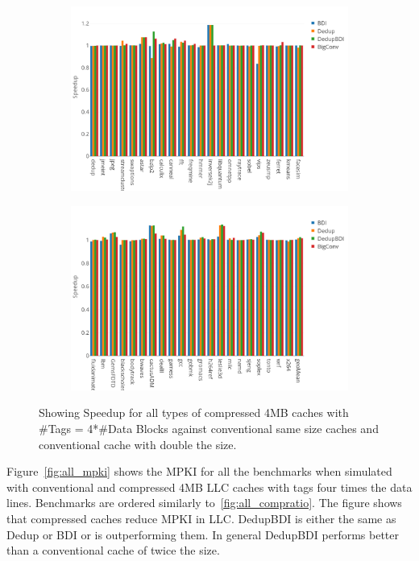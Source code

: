 \begin{figure}
    \begin{subfigure}{\textwidth}
        \includegraphics[width=\textwidth]{all4-speedup1.png}
    \end{subfigure}
    \begin{subfigure}{\textwidth}
        \includegraphics[width=\textwidth]{all4-speedup2.png}
    \end{subfigure}
    \caption[All benchmarks: 0.5MB Speedup]{Showing Speedup for all types of compressed 4MB caches with \#Tags = 4*\#Data Blocks against conventional same size caches and conventional cache with double the size.}
    \label{fig:all_speedup2}
\end{figure}
Figure~\ref{fig:all_mpki} shows the MPKI for all the benchmarks when simulated with conventional and compressed 4MB LLC caches with tags four times the data lines. Benchmarks are ordered similarly to~\ref{fig:all_compratio}. The figure shows that compressed caches reduce MPKI in LLC. DedupBDI is either the same as Dedup or BDI or is outperforming them. In general DedupBDI performs better than a conventional cache of twice the size.\par
